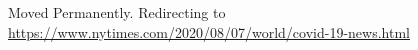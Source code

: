 Moved Permanently. Redirecting to
\href{https://www.nytimes.com/2020/08/07/world/covid-19-news.html}{https://www.nytimes.com/2020/08/07/world/covid-19-news.html}
